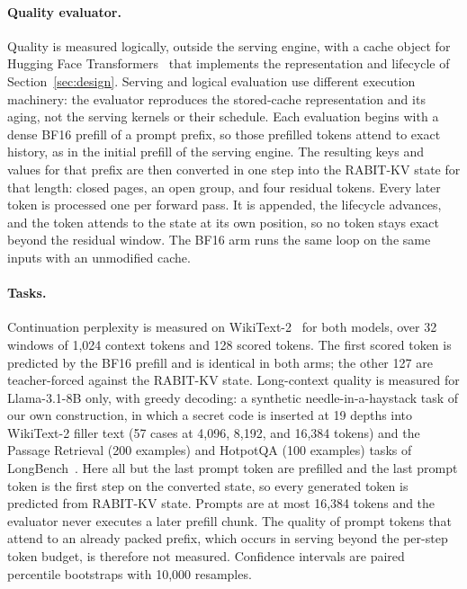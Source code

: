 \documentclass{article}
\begin{document}
\paragraph{Quality evaluator.}
Quality is measured logically, outside the serving engine, with a cache object for Hugging Face
Transformers~\citep{wolf2019transformers} that implements the representation and lifecycle of
Section~\ref{sec:design}. Serving and logical evaluation use different execution machinery: the
evaluator reproduces the stored-cache representation and its aging, not the serving kernels or their
schedule. Each evaluation begins with a dense BF16 prefill of a prompt prefix, so those prefilled
tokens attend to exact history, as in the initial prefill of the serving engine. The resulting keys and
values for that prefix are then converted in one step into the RABIT-KV state for that length: closed pages,
an open group, and four residual tokens. Every later token is processed one per forward pass. It is
appended, the lifecycle advances, and the token attends to the state at its own position, so no token
stays exact beyond the residual window. The BF16 arm runs the same loop on the same inputs with an
unmodified cache.

\paragraph{Tasks.}
Continuation perplexity is measured on WikiText-2~\citep{merity2016pointer} for both models, over 32 windows of 1,024
context tokens and 128 scored tokens. The first scored token is predicted by the BF16 prefill and is
identical in both arms; the other 127 are teacher-forced against the RABIT-KV state. Long-context
quality is measured for Llama-3.1-8B only, with greedy decoding: a synthetic needle-in-a-haystack task of our own construction, in which a
secret code is inserted at 19 depths into WikiText-2 filler text
(57 cases at 4,096, 8,192, and 16,384 tokens) and the Passage Retrieval (200 examples) and HotpotQA
(100 examples) tasks of LongBench~\citep{bai2024longbench,yang2018hotpotqa}. Here all but the last prompt token are
prefilled and the last prompt token is the first step on the converted state, so every generated token
is predicted from RABIT-KV state. Prompts are at most 16,384 tokens and the evaluator never executes a
later prefill chunk. The quality of prompt tokens that attend to an already packed prefix, which occurs
in serving beyond the per-step token budget, is therefore not measured. Confidence intervals are paired
percentile bootstraps with 10,000 resamples.
\end{document}
